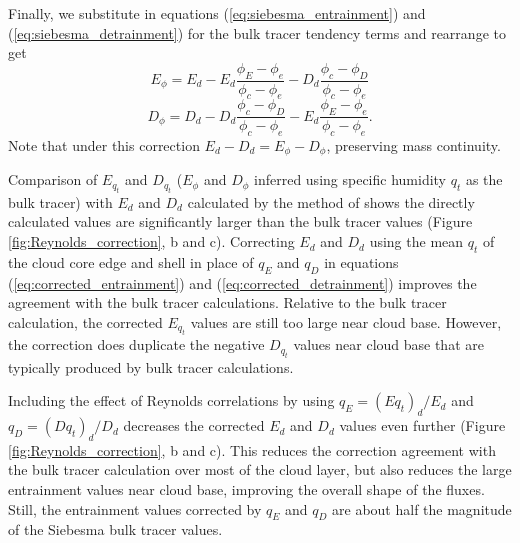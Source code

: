 \documentclass[draft,grl]{agutex}
\begin{document}
\begin{article}
Finally, we substitute in equations (\ref{eq:siebesma_entrainment}) and 
(\ref{eq:siebesma_detrainment}) for the bulk tracer tendency terms and 
rearrange to get
\begin{equation}
  \label{eq:corrected_entrainment}
    E_{\phi} = E_d - E_d\frac{\phi_E - \phi_e}{\phi_{c} - \phi_{e}}
             - D_d\frac{\phi_c - \phi_D}{\phi_{c} - \phi_{e}}
\end{equation}
\begin{equation}
  \label{eq:corrected_detrainment}
    D_{\phi} = D_d - D_d\frac{\phi_c - \phi_D}{\phi_{c} - \phi_{e}}
             - E_d\frac{\phi_E - \phi_e}{\phi_{c} - \phi_{e}}.
\end{equation}
Note that under this correction $E_d-D_d = E_{\phi}-D_{\phi}$, preserving 
mass continuity.

Comparison of $E_{q_t}$ and $D_{q_t}$ ($E_{\phi}$ and $D_{\phi}$ inferred using 
specific humidity $q_t$ as the bulk tracer) with $E_d$ and $D_d$ calculated by 
the method of \cite{Romps2010} shows the directly calculated values are 
significantly larger than the bulk tracer values (Figure 
\ref{fig:Reynolds_correction}, b and c).  Correcting $E_d$ and $D_d$ using the 
mean $q_t$ of the cloud core edge and shell in place of $q_E$ and $q_D$ in 
equations (\ref{eq:corrected_entrainment}) and (\ref{eq:corrected_detrainment})
improves the agreement with the bulk tracer calculations.  Relative to the bulk 
tracer calculation, the corrected $E_{q_t}$ values are still too large near 
cloud base.  However, the correction does duplicate the negative $D_{q_t}$ 
values near cloud base that are typically produced by bulk tracer calculations.

Including the effect of Reynolds correlations by using $q_E = (E q_t)_d/E_d$ 
and $q_D = (D q_t)_d/D_d$ decreases the corrected $E_d$ and $D_d$ values even 
further (Figure \ref{fig:Reynolds_correction}, b and c).  This reduces the 
correction agreement with the bulk tracer calculation over most of the cloud 
layer, but also reduces the large entrainment values near cloud base, improving 
the overall shape of the fluxes.  Still, the entrainment values corrected by 
$q_E$ and $q_D$ are about half the magnitude of the Siebesma bulk tracer 
values.


\end{article}
\end{document}
